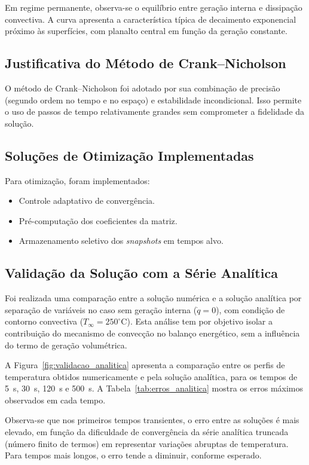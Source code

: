 \documentclass[12pt]{article}
\begin{document}
Em regime permanente, observa-se o equilíbrio entre geração interna e dissipação convectiva. A curva apresenta a característica típica de decaimento exponencial próximo às superfícies, com planalto central em função da geração constante.

\subsection{Justificativa do Método de Crank–Nicholson}

O método de Crank–Nicholson foi adotado por sua combinação de precisão (segundo ordem no tempo e no espaço) e estabilidade incondicional. Isso permite o uso de passos de tempo relativamente grandes sem comprometer a fidelidade da solução.

\subsection{Soluções de Otimização Implementadas}

Para otimização, foram implementados:
\begin{itemize}
    \item Controle adaptativo de convergência.
    \item Pré-computação dos coeficientes da matriz.
    \item Armazenamento seletivo dos \textit{snapshots} em tempos alvo.
\end{itemize}

\subsection{Validação da Solução com a Série Analítica}

Foi realizada uma comparação entre a solução numérica e a solução analítica por separação de variáveis no caso sem geração interna ($\dot{q} = 0$), com condição de contorno convectiva ($T_{\infty} = 250^\circ$C). Esta análise tem por objetivo isolar a contribuição do mecanismo de convecção no balanço energético, sem a influência do termo de geração volumétrica.

A Figura~\ref{fig:validacao_analitica} apresenta a comparação entre os perfis de temperatura obtidos numericamente e pela solução analítica, para os tempos de 5~s, 30~s, 120~s e 500~s. A Tabela~\ref{tab:erros_analitica} mostra os erros máximos observados em cada tempo.

Observa-se que nos primeiros tempos transientes, o erro entre as soluções é mais elevado, em função da dificuldade de convergência da série analítica truncada (número finito de termos) em representar variações abruptas de temperatura. Para tempos mais longos, o erro tende a diminuir, conforme esperado.
\end{document}
